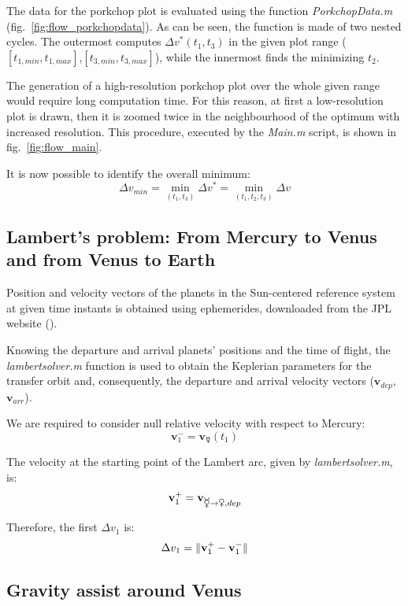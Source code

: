 The data for the porkchop plot is evaluated using the function \textit{PorkchopData.m} (fig.~\ref{fig:flow_porkchopdata}).
As can be seen, the function is made of two nested cycles. The outermost computes $\Delta v^*(t_1,t_3)$ in the given plot range ($[t_{1,min},t_{1,max}]$,$[t_{3,min},t_{3,max}]$), while the innermost finds the minimizing $t_2$.






The generation of a high-resolution porkchop plot over the whole given range would require long computation time. For this reason, at first a low-resolution plot is drawn, then it is zoomed twice in the neighbourhood of the optimum with increased resolution.
This procedure, executed by the {\it Main.m} script, is shown in fig.~\ref{fig:flow_main}.

It is now possible to identify the overall minimum:
$$\Delta v_{min}=\min_{(t_1,t_3)} \Delta v^*=\min_{(t_1,t_2,t_3)} \Delta v$$


\subsection{Lambert's problem: From Mercury to Venus and from Venus to Earth}

Position and velocity vectors of the planets in the Sun-centered reference system at given time instants is obtained using ephemerides, downloaded from the JPL website (\cite{ephemerides}).

Knowing the departure and arrival planets' positions and the time of flight, the {\it lambertsolver.m} function is used to obtain the Keplerian parameters for the transfer orbit and, consequently, the departure and arrival velocity vectors ($\mathbf v_{dep}$,$\mathbf v_{arr}$).

We are required to consider null relative velocity with respect to Mercury:
$$\mathbf v_1^-=\mathbf v_{\mercury}(t_1)$$

The velocity at the starting point of the Lambert arc, given by {\it lambertsolver.m}, is:
$$\mathbf v_1^+=\mathbf v_{\mercury\rightarrow\venus,dep}$$

Therefore, the first $\Delta v_1$ is:
$$\Delta v_1 = \lVert\mathbf v_1^+ - \mathbf v_1^-\rVert$$

\subsection{Gravity assist around Venus}

